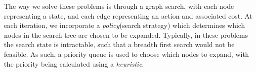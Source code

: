 \documentclass[12pt,a4paper,twoside,openright]{report}
\theoremstyle{definition}
\begin{document}
\begin{itemize}
\end{itemize}

The way we solve these problems is through a graph search, with each node representing a state, and each edge representing an action and associated cost. At each iteration, we incorporate a \textit{policy}(search strategy) which determines which nodes in the search tree are chosen to be expanded. Typically, in these problems the search state is intractable, such that a breadth first search would not be feasible. As such, a priority queue is used to choose which nodes to expand, with the priority being calculated using a \textit{heuristic}.
\end{document}
